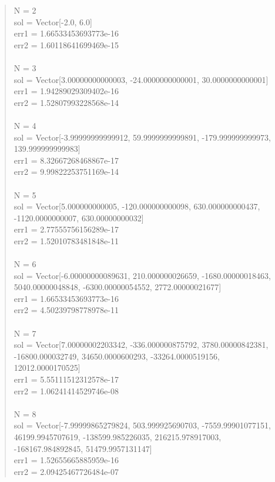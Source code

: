 \documentclass[letterpaper,12pt]{article}
\begin{document}
\begin{quote}
N = 2
\\sol = Vector[-2.0, 6.0]
\\err1 = 1.66533453693773e-16
\\err2 = 1.60118641699469e-15
\\
\\N = 3
\\sol = Vector[3.00000000000003, -24.0000000000001, 30.0000000000001]
\\err1 = 1.94289029309402e-16
\\err2 = 1.52807993228568e-14
\\
\\N = 4
\\sol = Vector[-3.99999999999912, 59.9999999999891, -179.999999999973, 139.999999999983]
\\err1 = 8.32667268468867e-17
\\err2 = 9.99822253751169e-14
\\
\\N = 5
\\sol = Vector[5.000000000005, -120.000000000098, 630.000000000437, -1120.0000000007, 630.00000000032]
\\err1 = 2.77555756156289e-17
\\err2 = 1.52010783481848e-11
\\
\\N = 6
\\sol = Vector[-6.00000000089631, 210.000000026659, -1680.00000018463, 5040.00000048848, -6300.00000054552, 2772.00000021677]
\\err1 = 1.66533453693773e-16
\\err2 = 4.50239798778978e-11
\\
\\N = 7
\\sol = Vector[7.00000002203342, -336.000000875792, 3780.00000842381, -16800.000032749, 34650.0000600293, -33264.0000519156, 12012.0000170525]
\\err1 = 5.55111512312578e-17
\\err2 = 1.06241414529746e-08
\\
\\N = 8
\\sol = Vector[-7.99999865279824, 503.999925690703, -7559.99901077151, 46199.9945707619, -138599.985226035, 216215.978917003, -168167.984892845, 51479.9957131147]
\\err1 = 1.52655665885959e-16
\\err2 = 2.09425467726484e-07
\\

\end{quote}
\end{document}
